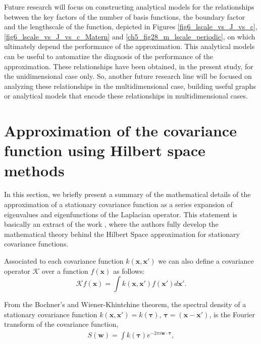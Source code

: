 \documentclass[onecolumn,a4paper,11pt]{article}
\begin{document}
Future research will focus on constructing analytical models for the relationships between the key factors of the number of basis functions, the boundary factor and the lengthscale of the function, depicted in Figures \ref{fig6_lscale_vs_J_vs_c}, \ref{fig6_lscale_vs_J_vs_c_Matern} and \ref{ch5_fig28_m_lscale_periodic}, on which ultimately depend the performance of the approximation. This analytical models can be useful to automatize the diagnosis of the performance of the approximation. These relationships have been obtained, in the present study, for the unidimensional case only. So, another future research line will be focused on analyzing these relationships in the multidimensional case, building useful graphs or analytical models that encode these relationships in multidimensional cases.




\appendix


\section{Approximation of the covariance function using Hilbert space methods} \label{ch5_app_approx_covfun}


In this section, we briefly present a summary of the mathematical details of the approximation of a stationary covariance function as a series expansion of eigenvalues and eigenfunctions of the Laplacian operator. This statement is basically an extract of the work \cite{solin2018hilbert}, where the authors fully develop the mathematical theory behind the Hilbert Space approximation for stationary covariance functions.

Associated to each covariance function $k(\bm{x},\bm{x}')$ we can also define a covariance operator $\mathcal{K}$ over a function $f(\bm{x})$ as follows:
%
\begin{equation*}
\mathcal{K} f(\bm{x}) = \int k(\bm{x},\bm{x}') f(\bm{x}') d\bm{x}'.
\end{equation*} 

From the Bochner’s and Wiener-Khintchine theorem, the spectral density of a stationary covariance function $k(\bm{x},\bm{x}') = k(\bm{\tau})$, $\bm{\tau}=(\bm{x}-\bm{x}')$, is the Fourier transform of the covariance function,
%
\begin{eqnarray*}
S(\bm{w}) = \int k(\bm{\tau}) e^{-2\pi i \bm{w} \cdot \bm{\tau}}, \nonumber
\end{eqnarray*}
\end{document}
